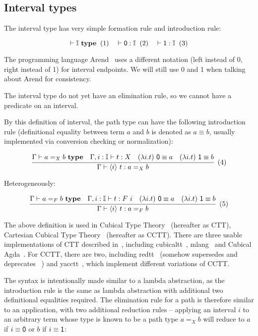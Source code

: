 \subsection{Interval types}
\label{subsec:interval}

The interval type has very simple formation rule
and introduction rule:

\[
  \vdash \mathbb I~\textbf{type}
  \xtag \quad
  \vdash \textsf 0 : \mathbb I
  \xtag \quad
  \vdash \textsf 1 : \mathbb I
  \xtag
\]

The programming language Arend~\cite{Arend} uses a different notation
(\textsf{left} instead of \textsf 0, \textsf{right} instead of \textsf 1)
for interval endpoints.
We will still use \textsf 0 and \textsf 1 when talking
about Arend for consistency.

The interval type do not yet have an elimination rule,
so we cannot have a predicate on an interval.

By this definition of interval, the path type can
have the following introduction rule
(definitional equality between term $a$ and $b$
is denoted as $a \equiv b$,
usually implemented via conversion checking or normalization):

\[
  \cfrac{
    \Gamma \vdash a =_X b~\textbf{type}
    \quad
    \Gamma, i : \mathbb I \vdash t : X
    \quad
    (\lambda i. t)~\textsf 0 \equiv a
    \quad
    (\lambda i. t)~\textsf 1 \equiv b
  }{
    \Gamma \vdash \lrangle i~t : a =_X b
  }
  \xtag
\]

Heterogeneously:

\[
  \cfrac{
    \Gamma \vdash a =_F b~\textbf{type}
    \quad
    \Gamma, i : \mathbb I \vdash t : F~i
    \quad
    (\lambda i. t)~\textsf 0 \equiv a
    \quad
    (\lambda i. t)~\textsf 1 \equiv b
  }{
    \Gamma \vdash \lrangle i~t : a =_F b
  }
  \xtag
\]

The above definition is used in Cubical Type Theory~\cite{CCHM,CHM}
(hereafter as CTT), Cartesian Cubical Type
Theory~\cite{CCTT,CCTT2,CHTT} (hereafter as CCTT).
There are three usable implementations of CTT described in~\cite{CHM},
including cubicaltt~\cite{CubicalTT},
mlang~\cite{Mlang} and Cubical Agda~\cite{CubicalAgda}.
For CCTT, there are two, including
redtt~\cite{RedTT} (somehow supersedes and deprecates
\RedPRL~\cite{RedPRL}) and yacctt~\cite{YaccTT},
which implement different variations of CCTT.

The syntax is intentionally made similar to a lambda abstraction,
as the introduction rule is the same as lambda abstraction with
additional two definitional equalities required.
The elimination rule for a path is therefore similar to an application,
with two additional reduction rules -- applying an interval $i$ to
an arbitrary term whose type is known to be a path type $a =_X b$
will reduce to $a$ if $i \equiv \textsf 0$ or $b$ if $i \equiv \textsf 1$:

